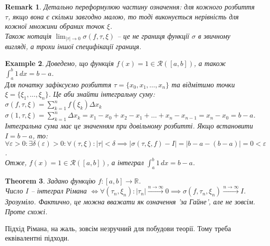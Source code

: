 \documentclass[a4paper, 10pt]{article}
\def\huge{\displaystyle}
\theoremstyle{theoremdd}
\newtheorem{theorem}{Theorem}[subsection]
\theoremstyle{theoremdd}
\theoremstyle{theoremdd}
\theoremstyle{theoremdd}
\theoremstyle{theoremdd}
\newtheorem{example}[theorem]{Example}
\theoremstyle{theoremdd}
\theoremstyle{theoremdd}
\newtheorem{remark}[theorem]{Remark}
\theoremstyle{theoremdd}
\theoremstyle{theoremdd}
\begin{document}
\begin{remark}
Детально переформулюю частину означення: для кожного розбиття $\tau$, якщо вона є скільки завгодно малою, то тоді виконується нерівність для кожної множини обраних точок $\xi$.\\
Також нотація $\huge\lim_{|\tau| \to 0} \sigma(f,\tau,\xi)$ -- це не границя функції $\sigma$ в звичному вигляді, а трохи іншої специфікації границя.
\end{remark}

\begin{example}
Доведемо, що функція $f(x) = 1 \in \mathcal{R}([a,b])$, а також $\huge \int_a^b 1\,dx = b-a$.\\
Для початку зафіксуємо розбиття $\tau = \{x_0,x_1,\dots,x_n\}$ та відмітимо точки $\xi = \{\xi_1,\dots,\xi_n\}$. Це аби знайти інтегральну суму:\\
$\sigma (f, \tau, \xi) = \huge \sum_{k=1}^n f(\xi_k) \Delta x_k$\\
$\sigma (1, \tau, \xi) = \huge \sum_{k=1}^n \Delta x_k = x_1 - x_0 + x_2 - x_1 + \dots + x_n - x_{n-1} = x_n - x_0 = b - a$.\\
Інтегральна сума має це значенням при довільному розбитті. Якщо встановити $I = b -a$, то:\\
$\forall \varepsilon > 0: \exists \delta(\varepsilon) > 0: \forall (\tau, \xi): |\tau| < \delta \implies |\sigma (\tau, \xi, f) - I| = |b-a - (b-a)| = 0 < \varepsilon$.\\
Отже, $f(x) = 1 \in \mathcal{R}([a,b])$, а інтеграл $\huge \int_a^b 1\,dx = b-a$.
\end{example}

\begin{theorem}
Задано функцію $f \colon [a,b] \to \mathbb{R}$.\\
Число $I$ -- інтеграл Рімана $\iff \forall (\tau_n, \xi_n): |\tau_n| \overset{n \to \infty}{\longrightarrow} 0 \implies \sigma(f, \tau_n, \xi_n) \overset{n \to \infty}{\longrightarrow} I$.\\
\textit{Зрозуміло. Фактично, це можна вважати як означення 'за Гайне', але не зовсім. Проте схожі.}
\end{theorem}

Підхід Рімана, на жаль, зовсім незручний для побудови теорії. Тому треба еквівалентні підходи.
\end{document}
